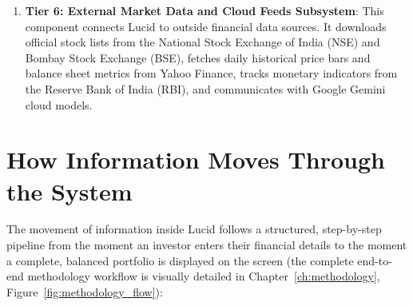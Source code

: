 \begin{enumerate}
    \item \textbf{Tier 6: External Market Data and Cloud Feeds Subsystem}: This component connects Lucid to outside financial data sources. It downloads official stock lists from the National Stock Exchange of India (NSE) and Bombay Stock Exchange (BSE), fetches daily historical price bars and balance sheet metrics from Yahoo Finance, tracks monetary indicators from the Reserve Bank of India (RBI), and communicates with Google Gemini cloud models.
\end{enumerate}

\section{How Information Moves Through the System}
The movement of information inside Lucid follows a structured, step-by-step pipeline from the moment an investor enters their financial details to the moment a complete, balanced portfolio is displayed on the screen (the complete end-to-end methodology workflow is visually detailed in Chapter~\ref{ch:methodology}, Figure~\ref{fig:methodology_flow}):
